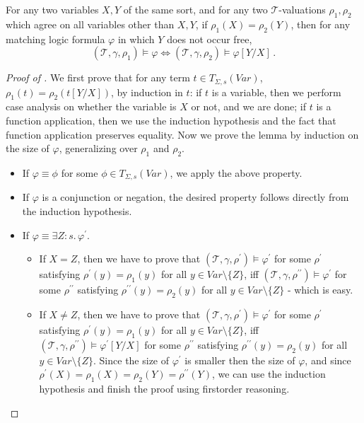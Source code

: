\begin{lemma}\label{lem:varrenamesem}
  For any two variables $X,Y$ of the same sort, and for any two $\mathcal{T}$-valuations $\rho_1, \rho_2$
  which agree on all variables other than $X,Y$, if $\rho_1(X) = \rho_2(Y)$, then for any matching logic formula
  $\varphi$ in which $Y$ does not occur free,
  \begin{equation*}
      (\mathcal{T}, \gamma, \rho_1) \vDash \varphi \iff (\mathcal{T}, \gamma, \rho_2) \vDash \varphi[Y/X] \, .
  \end{equation*}
\end{lemma}
\begin{proof}[Proof of ]
    We first prove that for any term $t \in T_{\Sigma, s}(\mathit{Var})$,
    $\rho_1(t) = \rho_2(t[Y/X])$, by induction in $t$:
    if $t$ is a variable, then we perform case analysis on whether the variable is $X$ or not, and we are done;
    if $t$ is a function application, then we use the induction hypothesis and the fact that function application preserves equality.
    Now we prove the lemma by induction on the size of $\varphi$, generalizing over $\rho_1$ and $\rho_2$.
    \begin{itemize}
        \item If $\varphi \equiv \phi$ for some $\phi \in T_{\Sigma, s}(\mathit{Var})$, we apply the above property.
        \item If $\varphi$ is a conjunction or negation, the desired property follows directly from the induction hypothesis.
        \item If $\varphi \equiv \exists Z : s.\, \varphi^\prime$.
        \begin{itemize}
            \item If $X = Z$, then we have to prove that $(\mathcal{T}, \gamma, \rho^\prime) \vDash \varphi^\prime$
            for some $\rho^\prime$ satisfying $\rho^\prime(y) = \rho_1(y)$ for all $y \in \mathit{Var} \setminus \{ Z \}$, iff $(\mathcal{T}, \gamma, \rho^{\prime\prime}) \vDash \varphi^\prime$
            for some $\rho^{\prime\prime}$ satisfying $\rho^{\prime\prime}(y) = \rho_2(y)$ for all $y \in \mathit{Var} \setminus \{ Z \}$ - which is easy.
            \item If $X \not = Z$, then we have to prove that
            $(\mathcal{T}, \gamma, \rho^\prime) \vDash \varphi^\prime$
            for some $\rho^\prime$ satisfying $\rho^\prime(y) = \rho_1(y)$ for all $y \in \mathit{Var} \setminus \{ Z \}$, iff $(\mathcal{T}, \gamma, \rho^{\prime\prime}) \vDash \varphi^\prime[Y/X]$ for some $\rho^{\prime\prime}$ satisfying $\rho^{\prime\prime}(y) = \rho_2(y)$ for all $y \in \mathit{Var} \setminus \{ Z \}$.
            Since the size of $\varphi^\prime$ is smaller then the size of $\varphi$,
            and since $\rho^{\prime}(X) = \rho_1(X) = \rho_2(Y) = \rho^{\prime\prime}(Y)$,
            we can use the induction hypothesis and finish the proof using firstorder reasoning.
        \end{itemize}
    \end{itemize}
\end{proof}



